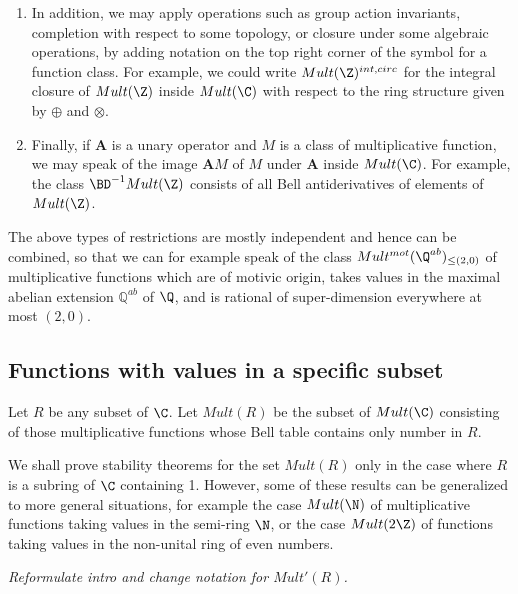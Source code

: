 \documentclass[a4paper]{article}
\begin{document}
\begin{enumerate}
\item In addition, we may apply operations such as group action invariants, completion with respect to some topology, or closure under some algebraic operations, by adding notation on the top right corner of the symbol for a function class. For example, we could write $Mult(\Z)^{int,circ}$ for the integral closure of $Mult(\Z)$ inside $Mult(\C)$ with respect to the ring structure given by $\oplus$ and $\otimes$.

\item Finally, if $\mathbf{A}$ is a unary operator and $M$ is a class of multiplicative function, we may speak of the image $\mathbf{A} M$ of $M$ under $\mathbf{A}$ inside $Mult(\C)$. For example, the class $\BD^{-1} Mult(\Z)$ consists of all Bell antiderivatives of elements of $Mult(\Z)$.  

\end{enumerate}

The above types of restrictions are mostly independent and hence can be combined, so that we can for example speak of the class $Mult^{mot}(\Q^{ab})_{\leq(2, 0)}$ of multiplicative functions which are of motivic origin, takes values in the maximal abelian extension $\mathbb{Q}^{ab}$ of $\Q$, and is rational of super-dimension everywhere at most $(2, 0)$.



\subsection{Functions with values in a specific subset}

\begin{definition}
Let $R$ be any subset of $\C$. Let $Mult(R)$ be the subset of $Mult(\C)$ consisting of those multiplicative functions whose Bell table contains only number in $R$.
\end{definition}

\begin{remark}
We shall prove stability theorems for the set $Mult(R)$ only in the case where $R$ is a subring of $\C$ containing 1. However, some of these results can be generalized to more general situations, for example the case $Mult(\N)$ of multiplicative functions taking values in the semi-ring $\N$, or the case $Mult(2 \Z)$ of functions taking values in the non-unital ring of even numbers.
\end{remark}

\emph{Reformulate intro and change notation for $Mult'(R)$.}
\end{document}
